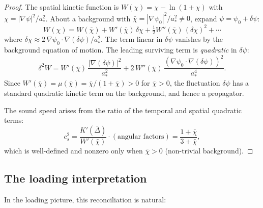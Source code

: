 \documentclass[11pt,a4paper]{article}
\begin{document}
\begin{proof}
The spatial kinetic function is $W(\chi) = \chi - \ln(1+\chi)$ with
$\chi = |\nabla\psi|^2/a_*^2$.  About a background with
$\bar\chi = |\nabla\psi_0|^2/a_*^2 \neq 0$, expand
$\psi = \psi_0 + \delta\psi$:
\begin{equation}
W(\chi) = W(\bar\chi) + W'(\bar\chi)\,\delta\chi
+ \tfrac{1}{2}W''(\bar\chi)\,(\delta\chi)^2 + \cdots
\end{equation}
where $\delta\chi \approx 2\,\nabla\psi_0\cdot\nabla(\delta\psi)/a_*^2$.
The term linear in $\delta\psi$ vanishes by the background equation of
motion.  The leading surviving term is \emph{quadratic} in
$\delta\psi$:
\begin{equation}
\delta^2 W = W'(\bar\chi)\,\frac{|\nabla(\delta\psi)|^2}{a_*^2}
+ 2\,W''(\bar\chi)\,
\frac{(\nabla\psi_0\cdot\nabla(\delta\psi))^2}{a_*^4}.
\end{equation}
Since $W'(\bar\chi) = \mu(\bar\chi) = \bar\chi/(1+\bar\chi) > 0$ for
$\bar\chi > 0$, the fluctuation $\delta\psi$ has a standard quadratic
kinetic term on the background, and hence a propagator.

The sound speed arises from the ratio of the temporal and spatial
quadratic terms:
\begin{equation}
c_s^2 = \frac{K'(\bar\Delta)}{W'(\bar\chi)}
\cdot (\text{angular factors})
= \frac{1 + \bar\chi}{3 + \bar\chi},
\end{equation}
which is well-defined and nonzero only when $\bar\chi > 0$ (non-trivial
background).
\end{proof}

\subsection{The loading interpretation}

In the loading picture, this reconciliation is natural:
\end{document}
